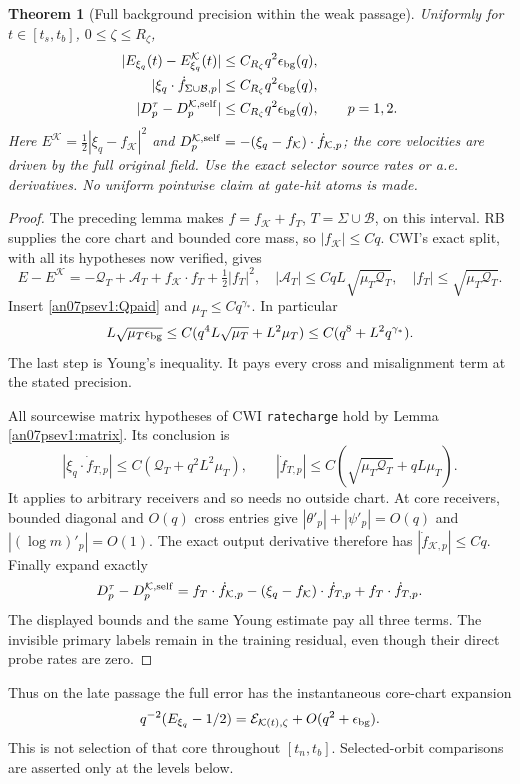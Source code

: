 \documentclass[11pt]{article}
\numberwithin{equation}{section}
\newtheorem{theorem}{Theorem}[section]
\theoremstyle{remark}\newtheorem{remark}[theorem]{Remark}
\newcommand{\KK}{\mathcal K}\newcommand{\BB}{\mathcal B}
\begin{document}
\begin{theorem}[Full background precision within the weak passage]
\label{an07psev1:lateprecision}
Uniformly for \(t\in[t_s,t_b]\), \(0\le\zeta\le R_\zeta\),
\begin{align}
 |E_{\xi_q}(t)-E_{\xi_q}^{\KK}(t)|
 &\le C_{R_\zeta}q^2\epsilon_{\rm bg}(q),\notag\\
 |\xi_q\cdot\dot f_{\Sigma\cup\BB,p}|
 &\le C_{R_\zeta}q^2\epsilon_{\rm bg}(q),\notag\\
 |D_p^\tau-D_p^{\KK,\rm self}|
 &\le C_{R_\zeta}q^2\epsilon_{\rm bg}(q),\qquad p=1,2 .
 \label{an07psev1:latebounds}
\end{align}
Here \(E^\KK=\tfrac12|\xi_q-f_\KK|^2\) and
\(D_p^{\KK,\rm self}=-(\xi_q-f_\KK)\cdot\dot f_{\KK,p}\);
the core velocities are driven by the full original field.
Use the exact selector source rates or a.e. derivatives.
No uniform pointwise claim at gate-hit atoms is made.
\end{theorem}
\begin{proof}
The preceding lemma makes \(f=f_\KK+f_T\), \(T=\Sigma\cup\BB\),
on this interval. RB supplies the core chart and bounded
core mass, so \(|f_\KK|\le Cq\).
CWI's exact split, with all its hypotheses now verified, gives
\[
 E-E^\KK=-\mathcal Q_T+\mathcal A_T
                      +f_\KK\cdot f_T+\tfrac12|f_T|^2,\quad
 |\mathcal A_T|\le CqL\sqrt{\mu_T\mathcal Q_T},\quad
 |f_T|\le\sqrt{\mu_T\mathcal Q_T}.
 \]
Insert \eqref{an07psev1:Qpaid} and
\(\mu_T\le Cq^{\gamma_*}\). In particular
\[
 L\sqrt{\mu_T\epsilon_{\rm bg}}
 \le C(q^4L\sqrt{\mu_T}+L^2\mu_T)
 \le C(q^8+L^2q^{\gamma_*}).
 \]
The last step is Young's inequality. It pays every cross
and misalignment term at the stated precision.

All sourcewise matrix hypotheses of CWI \texttt{ratecharge}
hold by Lemma \ref{an07psev1:matrix}. Its conclusion is
\[
 |\xi_q\cdot\dot f_{T,p}|
 \le C(\mathcal Q_T+q^2L^2\mu_T),\qquad
 |\dot f_{T,p}|
 \le C(\sqrt{\mu_T\mathcal Q_T}+qL\mu_T).
 \]
It applies to arbitrary receivers and so needs no outside
chart. At core receivers, bounded diagonal and \(O(q)\)
cross entries give \(|\theta'_p|+|\psi'_p|=O(q)\) and
\(|(\log m)'_p|=O(1)\). The exact output derivative therefore
has \(|\dot f_{\KK,p}|\le Cq\).
Finally expand exactly
\[
 D_p^\tau-D_p^{\KK,\rm self}
 =f_T\cdot\dot f_{\KK,p}
  -(\xi_q-f_\KK)\cdot\dot f_{T,p}
  +f_T\cdot\dot f_{T,p}.
 \]
The displayed bounds and the same Young estimate pay all
three terms. The invisible primary labels remain in the
training residual, even though their direct probe rates are zero.
\end{proof}
Thus on the late passage the full error has the instantaneous
core-chart expansion
\[
 q^{-2}(E_{\xi_q}-1/2)=\mathcal E_{\KK(t),\zeta}
                       +O(q^2+\epsilon_{\rm bg}).
 \]
This is not selection of that core throughout \([t_n,t_b]\).
Selected-orbit comparisons are asserted only at the levels below.
\end{document}

